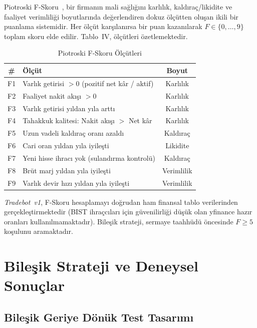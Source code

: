 \documentclass[journal]{IEEEtran}
\begin{document}
Piotroski F-Skoru~\cite{piotroski2000}, bir firmanın mali sağlığını
karlılık, kaldıraç/likidite ve faaliyet verimliliği boyutlarında
değerlendiren dokuz ölçütten oluşan ikili bir puanlama sistemidir.
Her ölçüt karşılanırsa bir puan kazanılarak $F \in \{0, \ldots, 9\}$
toplam skoru elde edilir. Tablo~IV, ölçütleri özetlemektedir.

\begin{table}[ht]
\caption{Piotroski F-Skoru Ölçütleri}
\label{tab:fscore}
\centering
\small
\renewcommand{\arraystretch}{1.1}
\begin{tabular}{clc}
\toprule
\textbf{\#} & \textbf{Ölçüt} & \textbf{Boyut} \\
\midrule
F1 & Varlık getirisi $> 0$ (pozitif net kâr / aktif) & Karlılık \\
F2 & Faaliyet nakit akışı $> 0$                      & Karlılık \\
F3 & Varlık getirisi yıldan yıla arttı               & Karlılık \\
F4 & Tahakkuk kalitesi: Nakit akışı $>$ Net kâr      & Karlılık \\
F5 & Uzun vadeli kaldıraç oranı azaldı               & Kaldıraç \\
F6 & Cari oran yıldan yıla iyileşti                  & Likidite \\
F7 & Yeni hisse ihracı yok (sulandırma kontrolü)     & Kaldıraç \\
F8 & Brüt marj yıldan yıla iyileşti                  & Verimlilik \\
F9 & Varlık devir hızı yıldan yıla iyileşti          & Verimlilik \\
\bottomrule
\end{tabular}
\end{table}

\textit{Tradebot~v1}, F-Skoru hesaplamayı doğrudan ham finansal tablo
verilerinden gerçekleştirmektedir (BIST ihraçcıları için güvenilirliği
düşük olan yfinance hazır oranları kullanılmamaktadır). Bileşik
strateji, sermaye taahhüdü öncesinde $F \geq 5$ koşulunu
aramaktadır.

\section{Bileşik Strateji ve Deneysel Sonuçlar}

\subsection{Bileşik Geriye Dönük Test Tasarımı}
\end{document}
